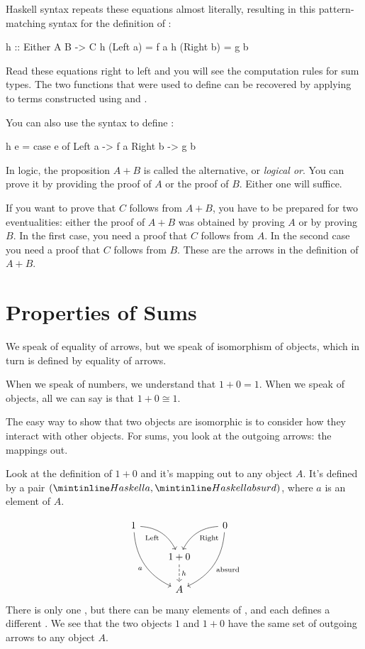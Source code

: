 \documentclass[DaoFP]{subfiles}
\begin{document}
Haskell syntax repeats these equations almost literally, resulting in this pattern-matching syntax for the definition of :

\begin{haskell}
h :: Either A B -> C
h (Left  a) = f a
h (Right b) = g b
\end{haskell}

Read these equations right to left and you will see the computation rules for sum types. The two functions that were used to define  can be recovered by applying  to terms constructed using  and . 

You can also use the  syntax to define :
\begin{haskell}
h e = case e of
  Left  a -> f a
  Right b -> g b
\end{haskell}

In logic, the proposition $A + B$ is called the alternative, or \emph{logical or}. You can prove it by providing the proof of $A$ or the proof of $B$. Either one will suffice. 

If you want to prove that $C$ follows from $A+B$, you have to be prepared for two eventualities: either the proof of $A+B$ was obtained by proving $A$ or by proving $B$. In the first case, you need a proof that $C$ follows from $A$. In the second case you need a proof that $C$ follows from $B$. These are the arrows in the definition of $A+B$.

\section{Properties of Sums}

We speak of equality of arrows, but we speak of isomorphism of objects, which in turn is defined by equality of arrows.

When we speak of numbers, we understand that $1 + 0 = 1$. When we speak of objects,  all we can say is that $1 + 0 \cong 1$. 

The easy way to show that two objects are isomorphic is to consider how they interact with other objects. For sums, you look at the outgoing arrows: the mappings out. 

Look at the definition of $1 + 0$ and it's mapping out to any object $A$. It's defined by a pair $(\hask{a}, \hask{absurd})$, where $a$ is an element of $A$. 

\[
 \begin{tikzcd}
 1
 \arrow[dr,  bend left, "\text{Left}"']
 \arrow[ddr, bend right, "a"']
 && 0
 \arrow[dl, bend right, "\text{Right}"]
 \arrow[ddl, bend left, "\text{absurd}"]
 \\
&1 + 0
\arrow[d, dashed, "h"]
\\
& A
 \end{tikzcd}
\]
There is only one , but there can be many elements of , and each  defines a different . We see that the two objects $1$ and $1 + 0$ have the same set of outgoing arrows to any object $A$. 
\end{document}
